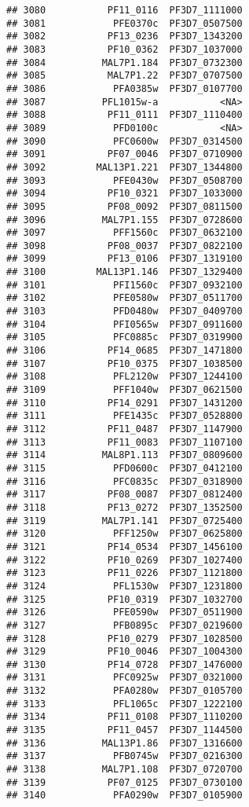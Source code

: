 \documentclass[12pt, a4paper]{article}\usepackage[]{graphicx}\usepackage[]{color}
\makeatletter
\newenvironment{kframe}{%
 \def\at@end@of@kframe{}%
 \ifinner\ifhmode%
  \def\at@end@of@kframe{\end{minipage}}%
  \begin{minipage}{\columnwidth}%
 \fi\fi%
 \def\FrameCommand##1{\hskip\@totalleftmargin \hskip-\fboxsep
 \colorbox{shadecolor}{##1}\hskip-\fboxsep
     \hskip-\linewidth \hskip-\@totalleftmargin \hskip\columnwidth}%
 \MakeFramed {\advance\hsize-\width
   \@totalleftmargin\z@ \linewidth\hsize
   \@setminipage}}%
 {\par\unskip\endMakeFramed%
 \at@end@of@kframe}
\newenvironment{knitrout}{}{} %
\makeatother
\begin{document}
\begin{knitrout}
\begin{kframe}
\begin{verbatim}
## 3080           PF11_0116  PF3D7_1111000
## 3081            PFE0370c  PF3D7_0507500
## 3082           PF13_0236  PF3D7_1343200
## 3083           PF10_0362  PF3D7_1037000
## 3084          MAL7P1.184  PF3D7_0732300
## 3085           MAL7P1.22  PF3D7_0707500
## 3086            PFA0385w  PF3D7_0107700
## 3087          PFL1015w-a           <NA>
## 3088           PF11_0111  PF3D7_1110400
## 3089            PFD0100c           <NA>
## 3090            PFC0600w  PF3D7_0314500
## 3091           PF07_0046  PF3D7_0710900
## 3092         MAL13P1.221  PF3D7_1344800
## 3093            PFE0430w  PF3D7_0508700
## 3094           PF10_0321  PF3D7_1033000
## 3095           PF08_0092  PF3D7_0811500
## 3096          MAL7P1.155  PF3D7_0728600
## 3097            PFF1560c  PF3D7_0632100
## 3098           PF08_0037  PF3D7_0822100
## 3099           PF13_0106  PF3D7_1319100
## 3100         MAL13P1.146  PF3D7_1329400
## 3101            PFI1560c  PF3D7_0932100
## 3102            PFE0580w  PF3D7_0511700
## 3103            PFD0480w  PF3D7_0409700
## 3104            PFI0565w  PF3D7_0911600
## 3105            PFC0885c  PF3D7_0319900
## 3106           PF14_0685  PF3D7_1471800
## 3107           PF10_0375  PF3D7_1038500
## 3108            PFL2120w  PF3D7_1244100
## 3109            PFF1040w  PF3D7_0621500
## 3110           PF14_0291  PF3D7_1431200
## 3111            PFE1435c  PF3D7_0528800
## 3112           PF11_0487  PF3D7_1147900
## 3113           PF11_0083  PF3D7_1107100
## 3114          MAL8P1.113  PF3D7_0809600
## 3115            PFD0600c  PF3D7_0412100
## 3116            PFC0835c  PF3D7_0318900
## 3117           PF08_0087  PF3D7_0812400
## 3118           PF13_0272  PF3D7_1352500
## 3119          MAL7P1.141  PF3D7_0725400
## 3120            PFF1250w  PF3D7_0625800
## 3121           PF14_0534  PF3D7_1456100
## 3122           PF10_0269  PF3D7_1027400
## 3123           PF11_0226  PF3D7_1121800
## 3124            PFL1530w  PF3D7_1231800
## 3125           PF10_0319  PF3D7_1032700
## 3126            PFE0590w  PF3D7_0511900
## 3127            PFB0895c  PF3D7_0219600
## 3128           PF10_0279  PF3D7_1028500
## 3129           PF10_0046  PF3D7_1004300
## 3130           PF14_0728  PF3D7_1476000
## 3131            PFC0925w  PF3D7_0321000
## 3132            PFA0280w  PF3D7_0105700
## 3133            PFL1065c  PF3D7_1222100
## 3134           PF11_0108  PF3D7_1110200
## 3135           PF11_0457  PF3D7_1144500
## 3136          MAL13P1.86  PF3D7_1316600
## 3137            PFB0745w  PF3D7_0216300
## 3138          MAL7P1.108  PF3D7_0720700
## 3139           PF07_0125  PF3D7_0730100
## 3140            PFA0290w  PF3D7_0105900

\end{verbatim}
\end{kframe}
\end{knitrout}
\end{document}
